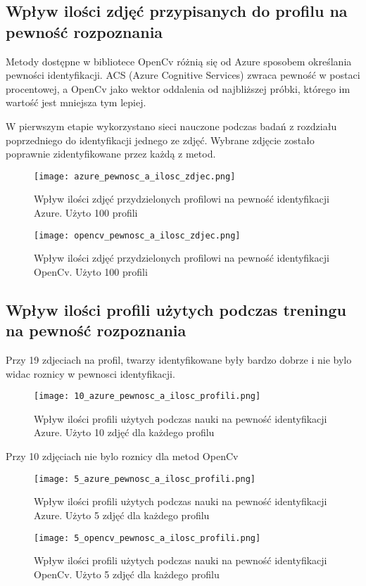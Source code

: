 \subsection{Wpływ ilości zdjęć przypisanych do profilu na pewność rozpoznania}
Metody dostępne w bibliotece OpenCv różnią się od Azure sposobem określania pewności identyfikacji. ACS (Azure Cognitive Services) zwraca pewność w postaci procentowej, a OpenCv jako wektor oddalenia od najbliższej próbki, którego im wartość jest mniejsza tym lepiej.

W pierwszym etapie wykorzystano sieci nauczone podczas badań z rozdziału poprzedniego do identyfikacji jednego ze zdjęć. Wybrane zdjęcie zostało poprawnie zidentyfikowane przez każdą z metod.
\begin{figure}[H]
	\centering
	\texttt{[image: azure\_pewnosc\_a\_ilosc\_zdjec.png]}
	\caption{Wpływ ilości zdjęć przydzielonych profilowi na pewność identyfikacji Azure. Użyto 100 profili}
	\label{fig:azure_zdjecia}
\end{figure}
\begin{figure}[H]
	\centering
	\texttt{[image: opencv\_pewnosc\_a\_ilosc\_zdjec.png]}
	\caption{Wpływ ilości zdjęć przydzielonych profilowi na pewność identyfikacji OpenCv. Użyto 100 profili}
	\label{fig:opencv_zdjecia}
\end{figure}

\subsection{Wpływ ilości profili użytych podczas treningu na pewność rozpoznania}
Przy 19 zdjeciach na profil, twarzy identyfikowane były bardzo dobrze i nie bylo widac roznicy w pewnosci identyfikacji.
\begin{figure}[H]
	\centering
	\texttt{[image: 10\_azure\_pewnosc\_a\_ilosc\_profili.png]}
	\caption{Wpływ ilości profili użytych podczas nauki na pewność identyfikacji Azure. Użyto 10 zdjęć dla każdego profilu}
	\label{fig:azure_10__profile}
\end{figure}
Przy 10 zdjęciach nie bylo roznicy dla metod OpenCv
\begin{figure}[H]
	\centering
	\texttt{[image: 5\_azure\_pewnosc\_a\_ilosc\_profili.png]}
	\caption{Wpływ ilości profili użytych podczas nauki na pewność identyfikacji Azure. Użyto 5 zdjęć dla każdego profilu}
	\label{fig:azure_5__profile}
\end{figure}
\begin{figure}[H]
	\centering
	\texttt{[image: 5\_opencv\_pewnosc\_a\_ilosc\_profili.png]}
	\caption{Wpływ ilości profili użytych podczas nauki na pewność identyfikacji OpenCv. Użyto 5 zdjęć dla każdego profilu}
	\label{fig:azure_5__profile}
\end{figure}

